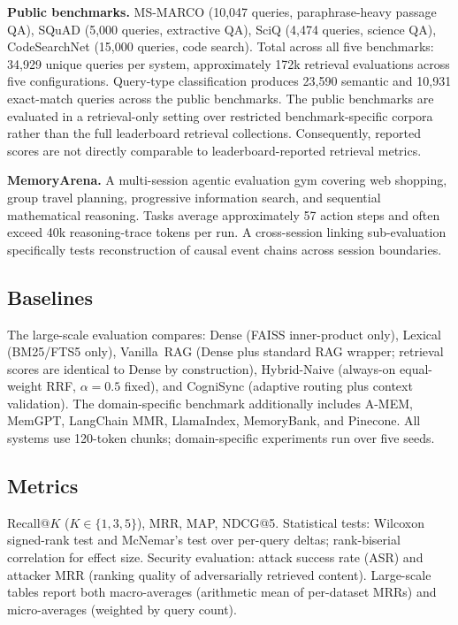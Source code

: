 \documentclass[sigconf]{acmart}
\begin{document}
\textbf{Public benchmarks.} MS-MARCO (10,047 queries, paraphrase-heavy
passage QA), SQuAD (5,000 queries, extractive QA), SciQ (4,474 queries,
science QA), CodeSearchNet (15,000 queries, code search). Total across
all five benchmarks: 34,929 unique queries per system, approximately 172k retrieval evaluations across five configurations. Query-type classification produces 23,590
semantic and 10,931 exact-match queries across the public benchmarks. The public benchmarks are evaluated in a retrieval-only setting over restricted benchmark-specific corpora rather than the full leaderboard retrieval collections. Consequently, reported scores are not directly comparable to leaderboard-reported retrieval metrics.

\textbf{MemoryArena.} A multi-session agentic evaluation gym covering
web shopping, group travel planning, progressive information search, and
sequential mathematical reasoning. Tasks average approximately 57 action steps and often exceed 40k reasoning-trace tokens per run. A cross-session linking
sub-evaluation specifically tests reconstruction of causal event chains
across session boundaries.

\subsection{Baselines}

The large-scale evaluation compares: Dense (FAISS inner-product only),
Lexical (BM25/FTS5 only), Vanilla~RAG (Dense plus standard RAG wrapper;
retrieval scores are identical to Dense by construction), Hybrid-Naive
(always-on equal-weight RRF, $\alpha=0.5$ fixed), and CogniSync
(adaptive routing plus context validation). The domain-specific benchmark
additionally includes A-MEM, MemGPT, LangChain MMR, LlamaIndex,
MemoryBank, and Pinecone. All systems use 120-token chunks; domain-specific
experiments run over five seeds.

\subsection{Metrics}

Recall@$K$ ($K \in \{1,3,5\}$), MRR, MAP, NDCG@5. Statistical tests: Wilcoxon signed-rank test and McNemar's test over per-query deltas; rank-biserial correlation for effect size. Security evaluation: attack success rate
(ASR) and attacker MRR (ranking quality of adversarially retrieved content). Large-scale tables
report both macro-averages (arithmetic mean of per-dataset MRRs) and
micro-averages (weighted by query count).
\end{document}
